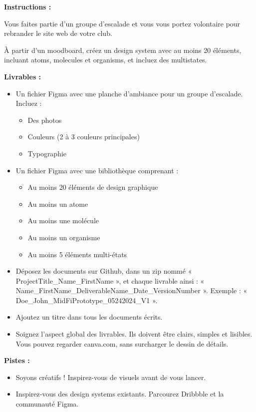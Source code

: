 \makeheaderfiles

\textbf{Instructions :}

Vous faites partie d'un groupe d'escalade et vous vous portez volontaire pour rebrander le site web de votre club.

À partir d'un moodboard, créez un design system avec au moins 20 éléments, incluant atoms, molecules et organisms, et incluez des multistates.

\textbf{Livrables :}

\begin{itemize}
\item Un fichier Figma avec une planche d'ambiance pour un groupe d'escalade. Incluez :
\begin{itemize}
\item Des photos
\item Couleurs (2 à 3 couleurs principales)
\item Typographie
\end{itemize}
\item Un fichier Figma avec une bibliothèque comprenant :
\begin{itemize}
\item Au moins 20 éléments de design graphique
\item Au moins un atome
\item Au moins une molécule
\item Au moins un organisme
\item Au moins 5 éléments multi-états
\end{itemize}
\item Déposez les documents sur Github, dans un zip nommé « ProjectTitle\_Name\_FirstName », et chaque livrable ainsi : « Name\_FirstName\_DeliverableName\_Date\_VersionNumber ». Exemple : « Doe\_John\_MidFiPrototype\_05242024\_V1 ».
\item Ajoutez un titre dans tous les documents écrits.
\item Soignez l'aspect global des livrables. Ils doivent être clairs, simples et lisibles. Vous pouvez regarder canva.com, sans surcharger le dessin de détails.
\end{itemize}

\textbf{Pistes :}

\begin{itemize}
\item Soyons créatifs ! Inspirez-vous de visuels avant de vous lancer.
\item Inspirez-vous des design systems existants. Parcourez Dribbble et la communauté Figma.
\end{itemize}

